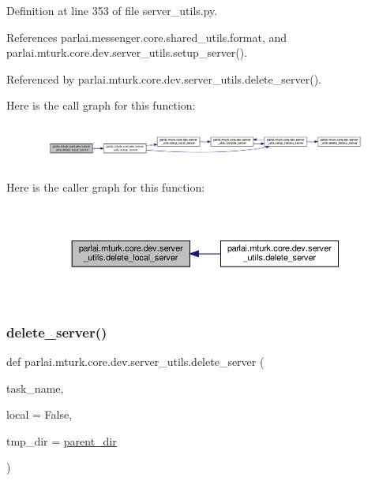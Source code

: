 Definition at line 353 of file server\+\_\+utils.\+py.



References parlai.\+messenger.\+core.\+shared\+\_\+utils.\+format, and parlai.\+mturk.\+core.\+dev.\+server\+\_\+utils.\+setup\+\_\+server().



Referenced by parlai.\+mturk.\+core.\+dev.\+server\+\_\+utils.\+delete\+\_\+server().

Here is the call graph for this function\+:
\nopagebreak
\begin{figure}[H]
\begin{center}
\leavevmode
\includegraphics[width=350pt]{namespaceparlai_1_1mturk_1_1core_1_1dev_1_1server__utils_aa5556bd5a5a417d78b4142e697e9a6be_cgraph}
\end{center}
\end{figure}
Here is the caller graph for this function\+:
\nopagebreak
\begin{figure}[H]
\begin{center}
\leavevmode
\includegraphics[width=350pt]{namespaceparlai_1_1mturk_1_1core_1_1dev_1_1server__utils_aa5556bd5a5a417d78b4142e697e9a6be_icgraph}
\end{center}
\end{figure}
\mbox{\label{namespaceparlai_1_1mturk_1_1core_1_1dev_1_1server__utils_a3e5b4105c54a289108a8a240aa9b9043}} 
\subsubsection{\texorpdfstring{delete\+\_\+server()}{delete\_server()}}
{\footnotesize\ttfamily def parlai.\+mturk.\+core.\+dev.\+server\+\_\+utils.\+delete\+\_\+server (\begin{DoxyParamCaption}\item[{}]{task\+\_\+name,  }\item[{}]{local = {\ttfamily False},  }\item[{}]{tmp\+\_\+dir = {\ttfamily \hyperlink{namespaceparlai_1_1mturk_1_1core_1_1dev_1_1server__utils_a432ae14c0d872fbfebe4d9b7d73d13b9}{parent\+\_\+dir}} }\end{DoxyParamCaption})}



